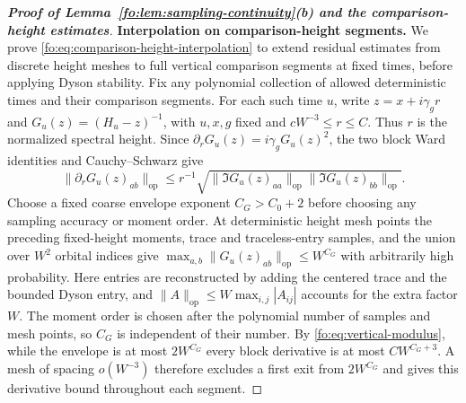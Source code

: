 \documentclass[11pt]{article}
\numberwithin{equation}{section}
\theoremstyle{remark}
\newcommand{\op}{\mathrm{op}}
\begin{document}
\begin{proof}[\textbf{Proof of Lemma~\ref{fo:lem:sampling-continuity}(b) and the comparison-height estimates}]
\noindent\textbf{Interpolation on comparison-height segments.}
We prove \eqref{fo:eq:comparison-height-interpolation} to extend residual
estimates from discrete height meshes to full vertical comparison segments
at fixed times, before applying Dyson stability.
Fix any polynomial collection of allowed deterministic times and their
comparison segments. For each such time $u$, write
$z=x+i\gamma_g r$ and $G_u(z)=(H_u-z)^{-1}$, with $u,x,g$ fixed and
$cW^{-3}\le r\le C$. Thus $r$ is the normalized spectral height.
Since $\partial_rG_u(z)=i\gamma_gG_u(z)^2$, the two block Ward identities and
Cauchy--Schwarz give
\begin{equation}\label{fo:eq:vertical-modulus}
 \|\partial_rG_u(z)_{ab}\|_{\op}
 \le r^{-1}\sqrt{\|\Im G_u(z)_{aa}\|_{\op}
                         \|\Im G_u(z)_{bb}\|_{\op}}.
\end{equation}
Choose a fixed coarse envelope exponent $C_G>C_0+2$ before choosing
any sampling accuracy or moment order. At deterministic height mesh
points the preceding fixed-height moments, trace and traceless-entry
samples, and the union over $W^2$ orbital indices give
$\max_{a,b}\|G_u(z)_{ab}\|_{\op}\le W^{C_G}$ with arbitrarily high
probability. Here entries are reconstructed by adding the centered
trace and the bounded Dyson entry, and
$\|A\|_{\op}\le W\max_{i,j}|A_{ij}|$ accounts for the extra factor $W$.
The moment order is chosen after the polynomial number of samples and
mesh points, so $C_G$ is independent of their number.
By \eqref{fo:eq:vertical-modulus}, while the envelope is at most
$2W^{C_G}$ every block derivative is at most $CW^{C_G+3}$.
A mesh of spacing $o(W^{-3})$ therefore excludes a first exit from
$2W^{C_G}$ and gives this derivative bound throughout each segment.


\end{proof}
\end{document}
